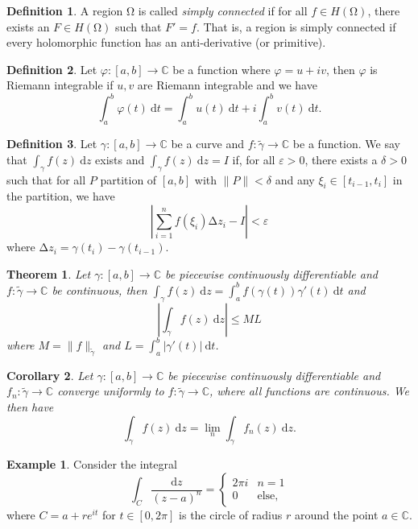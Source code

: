\documentclass[letterpaper,12pt]{article}
\theoremstyle{definition}
\newtheorem{definition}{Definition}[section]
\newtheorem{example}{Example}[section]
\theoremstyle{plain}
\newtheorem{thm}{Theorem}[section]
\newtheorem{corollary}[thm]{Corollary}
\theoremstyle{remark}
\newcommand{\C}{\mathbb{C}}
\newcommand{\wt}{\widetilde}
\let\oldOmega\Omega
\renewcommand{\Omega}{\mathrm{\oldOmega}}
\let\oldDelta\Delta
\renewcommand{\Delta}{\mathrm{\oldDelta}}
\begin{document}
\begin{definition}
A region $\Omega$ is called \emph{simply connected} if for all $f\in H(\Omega)$, there exists an $F\in H(\Omega)$ such that $F'=f$. That is, a region is simply connected if every holomorphic function has an anti-derivative (or primitive).
\end{definition}

\begin{definition}
Let $\varphi:[a,b]\to \C$ be a function where $\varphi = u+iv$, then $\varphi$ is Riemann integrable if $u,v$ are Riemann integrable and we have
\[\int_a^b \varphi(t)\ \mathrm{d}t = \int_{a}^{b} u(t) \ \mathrm{d}t + i \int_{a}^{b} v(t) \ \mathrm{d}t.\]
\end{definition}

\begin{definition}
Let $\gamma:[a,b]\to\C$ be a curve and $f:\wt{\gamma}\to\C$ be a function. We say that $\int_\gamma f(z) \ \mathrm{d}z$ exists and $\int_\gamma f(z) \ \mathrm{d}z=I$ if, for all $\varepsilon>0$, there exists a $\delta>0$ such that for all $P$ partition of $[a,b]$ with $\|P\|<\delta$ and any $\xi_i\in[t_{i-1},t_i]$ in the partition, we have
\[\left|\sum_{i=1}^nf(\xi_i)\Delta z_i - I\right| < \varepsilon\]
where $\Delta z_i = \gamma(t_i)-\gamma(t_{i-1})$.
\end{definition}

\begin{thm}
Let $\gamma:[a,b]\to\C$ be piecewise continuously differentiable and $f:\wt{\gamma}\to\C$ be continuous, then $\int_\gamma f(z)\ \mathrm{d}z = \int_a^b f(\gamma(t))\gamma'(t)\ \mathrm{d}t$ and
\[\left|\int_\gamma f(z)\ \mathrm{d}z\right|\leq ML\]
where $M = \|f\|_{\wt{\gamma}}$ and $L = \int_a^b |\gamma'(t)|\ \mathrm{d}t$.
\end{thm}

\begin{corollary}
Let $\gamma:[a,b]\to\C$ be piecewise continuously differentiable and $f_n:\wt{\gamma}\to \C$ converge uniformly to $f:\wt{\gamma}\to\C$, where all functions are continuous. We then have
\[\int_\gamma f(z)\ \mathrm{d}z = \lim_n \int_\gamma f_n(z)\ \mathrm{d}z.\]
\end{corollary}

\begin{example}
Consider the integral
\[\int_C \frac{\mathrm{d}z}{(z-a)^n} = \begin{cases}
2\pi i & n=1 \\
0& \text{else},
\end{cases}\]
where $C = a+re^{it}$ for $t\in[0,2\pi]$ is the circle of radius $r$ around the point $a\in\C$.
\end{example}
\end{document}
